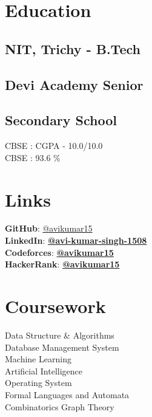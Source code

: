 \documentclass[]{deedy-resume-openfont}
\begin{document}

\begin{minipage}[t]{0.31\textwidth}

\section{Education} 

\subsection{NIT, Trichy - B.Tech}

\sectionsep

\subsection{Devi Academy Senior}
\subsection{Secondary School}
CBSE : CGPA - 10.0/10.0 \\
CBSE : 93.6 \%
\sectionsep

\section{Links} 
\textbf{GitHub}: \href{https://github.com/avikumar15}{@avikumar15} \\
\textbf{LinkedIn}: \textbf{\href{https://www.linkedin.com/in/avi-kumar-singh-1508}{@avi-kumar-singh-1508}} \\
\textbf{Codeforces}: \textbf{\href{https://codeforces.com/profile/avikumar15}{@avikumar15}}  \\
\textbf{HackerRank}:  \textbf{\href{https://www.hackerrank.com/avikumar15?hr_r=1}{@avikumar15}}  \\
\sectionsep

\section{Coursework}
Data Structure \& Algorithms \\
Database Management System \\
Machine Learning \\
Artificial Intelligence \\
Operating System \\
Formal Languages and Automata \\ 
Combinatorics Graph Theory \\


\end{minipage}
\end{document}
